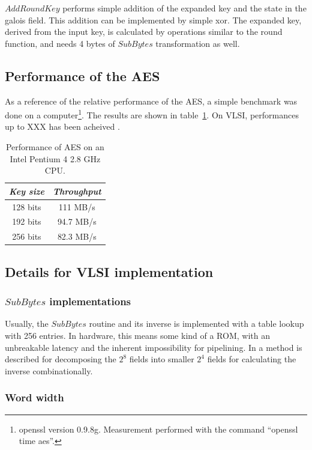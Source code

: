 $AddRoundKey$ performs simple addition of the expanded key and the
state in the galois field. This addition can be implemented by simple
xor. The expanded key, derived from the input key, is calculated by
operations similar to the round function, and needs 4 bytes of
$SubBytes$ transformation as well.

\subsection{Performance of the AES}

As a reference of the relative performance of the AES, a simple
benchmark was done on a computer\footnote{openssl version
  0.9.8g. Measurement performed with the command ``openssl time
  aes''.}. The results are shown in table~\ref{tab:aes}. On VLSI,
performances up to XXX has been acheived \cite{xxx}.

\begin{table}[h]
  \centering
  \begin{tabular}{|c|c|}
    \hline
    \emph{Key size} & \emph{Throughput} \\ \hline
    128 bits        & 111 MB/s \\
    192 bits        & 94.7 MB/s \\
    256 bits        & 82.3 MB/s \\ \hline
  \end{tabular}
  \caption{Performance of AES on an Intel Pentium 4 2.8 GHz CPU.}
  \label{tab:aes}
\end{table}

\subsection{Details for VLSI implementation}

\subsubsection{$SubBytes$ implementations}

Usually, the $SubBytes$ routine and its inverse is implemented with a
table lookup with 256 entries. In hardware, this means some kind of a
ROM, with an unbreakable latency and the inherent impossibility for
pipelining. In \cite{csbox} a method is described for decomposing the
$2^8$ fields into smaller $2^4$ fields for calculating the inverse
combinationally.

\subsubsection{Word width}

